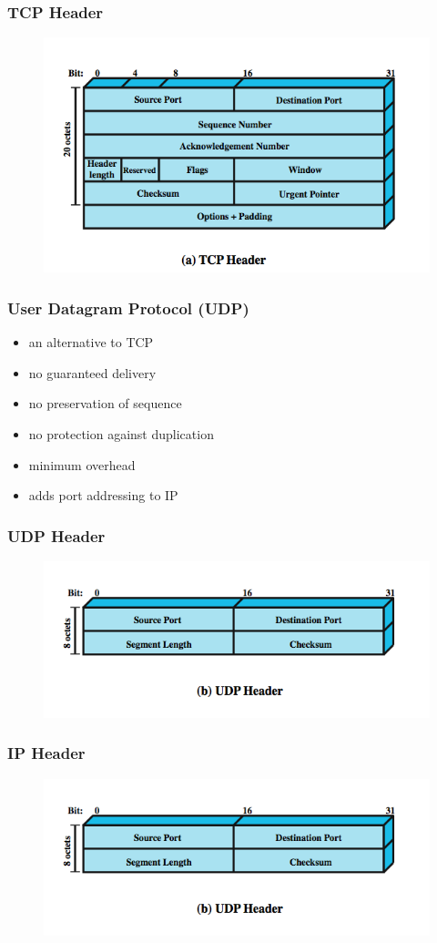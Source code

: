 \documentclass[pdflatex,compress]{beamer}
\begin{document}
\begin{frame}
	\frametitle{TCP Header}
	\begin{figure}
		\centering
		\includegraphics[width=0.8\linewidth]{img/img04}
	\end{figure}
\end{frame}

\begin{frame}
	\frametitle{User Datagram Protocol (UDP)}
	\begin{itemize}
		\item an alternative to TCP
		\item no guaranteed delivery
		\item no preservation of sequence
		\item no protection against duplication
		\item minimum overhead
		\item adds port addressing to IP
	\end{itemize}
\end{frame}

\begin{frame}
	\frametitle{UDP Header}
	\begin{figure}
		\centering
		\includegraphics[width=0.8\linewidth]{img/img05}
	\end{figure}
\end{frame}

\begin{frame}
	\frametitle{IP Header}
	\begin{figure}
		\centering
		\includegraphics[width=0.8\linewidth]{img/img05}
	\end{figure}
\end{frame}
\end{document}
